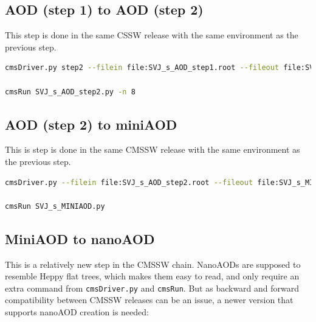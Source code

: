 \subsection{AOD (step 1) to AOD (step 2)}

This step is done in the same CSSW release with the same environment as the previous step.

\begin{lstlisting}[belowskip=-0.7cm, language=sh, numbers=none]
cmsDriver.py step2 --filein file:SVJ_s_AOD_step1.root --fileout file:SVJ_s_AOD_step2.root --mc --eventcontent AODSIM --runUnscheduled --datatier AODSIM --conditions 80X_mcRun2_asymptotic_2016_TrancheIV_v6 --step RAW2DIGI,RECO,EI --era Run2_2016 --python_filename SVJ_s_AOD_step2.py --no_exec --customise Configuration/DataProcessing/Utils.addMonitoring -n 250

cmsRun SVJ_s_AOD_step2.py -n 8
\end{lstlisting}


\subsection{AOD (step 2) to miniAOD}

This is step is done in the same CMSSW release with the same environment as the previous step.

\begin{lstlisting}[belowskip=-0.7cm, language=sh, numbers=none]
cmsDriver.py --filein file:SVJ_s_AOD_step2.root --fileout file:SVJ_s_MINIAOD.root --mc --eventcontent MINIAODSIM --runUnscheduled --datatier MINIAODSIM --conditions 80X_mcRun2_asymptotic_2016_TrancheIV_v6 --step PAT --era Run2_2016 --python_filename SVJ_s_MINIAOD.py --no_exec --customise Configuration/DataProcessing/Utils.addMonitoring -n 250

cmsRun SVJ_s_MINIAOD.py
\end{lstlisting}


\subsection{MiniAOD to nanoAOD}

This is a relatively new step in the CMSSW chain. NanoAODs are supposed to resemble Heppy flat trees, which makes them easy to read, and only require an extra command from \texttt{cmsDriver.py} and \texttt{cmsRun}. But as backward and forward compatibility between CMSSW releases can be an issue, a newer version that supports nanoAOD creation is needed:


